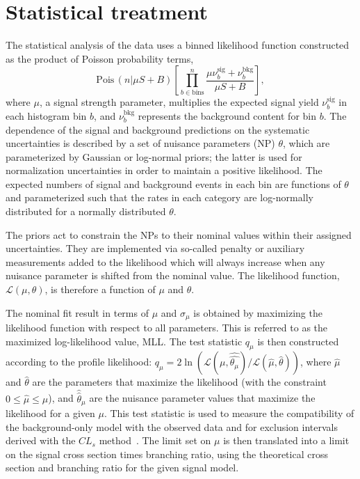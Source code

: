 \chapter{Statistical treatment}

The statistical analysis of the data uses a binned likelihood function constructed as the product of Poisson probability terms,
\begin{equation}     \mathrm{Pois}\,(n|\mu S+B)\left[ \prod_{b\in \text{bins}}^{n} \frac{\mu \nu^{\mathrm{sig}}_{b}+\nu^{\mathrm{bkg}}_{b}}{\mu S+B} \right],
\end{equation} where $\mu$,
a signal strength parameter, multiplies the expected signal yield $\nu^{\mathrm{sig}}_b$ in each histogram bin $b$, and $\nu^{\mathrm{bkg}}_b$ represents the background content for bin $b$.
The dependence of the signal and background predictions on the systematic uncertainties is described by a set of nuisance parameters (NP) $\theta$, which are parameterized by Gaussian or log-normal priors; the latter is used for normalization uncertainties in order to maintain a positive likelihood.
The expected numbers of signal and background events in each bin are functions of $\theta$ and parameterized such that the rates in each category are log-normally distributed for a normally distributed $\theta$.

The priors act to constrain the NPs to their nominal values within their assigned uncertainties.
They are implemented via so-called penalty or auxiliary measurements added to the likelihood which will always increase when any nuisance parameter is shifted from the nominal value.
The likelihood function, $\mathcal{L} (\mu,\theta)$, is therefore a function of $\mu$ and $\theta$.

The nominal fit result in terms of $\mu$ and $\sigma_{\mu}$ is obtained by maximizing the likelihood function with respect to all parameters.
This is referred to as the maximized log-likelihood value, MLL.
The test statistic $q_\mu$ is then constructed according to the profile likelihood: $q_\mu = 2 \ln (\mathcal{L} (\mu, \hat{\hat{\theta_\mu}})/\mathcal{L} (\hat{\mu}, \hat{\theta}))$, where $\hat{\mu}$ and $\hat{\theta}$ are the parameters that maximize the likelihood (with the constraint $0 \leq \hat{\mu} \leq \mu$), and $\hat{\hat{\theta}}_\mu$ are the nuisance parameter values that maximize the likelihood for a given $\mu$.
This test statistic is used to measure the compatibility of the background-only model with the observed data and for exclusion intervals derived with the $CL_s$ method~\cite{Cowan:2010js}.
The limit set on $\mu$ is then translated into a limit on the signal cross section times branching ratio, using the theoretical cross section and branching ratio for the given signal model.




